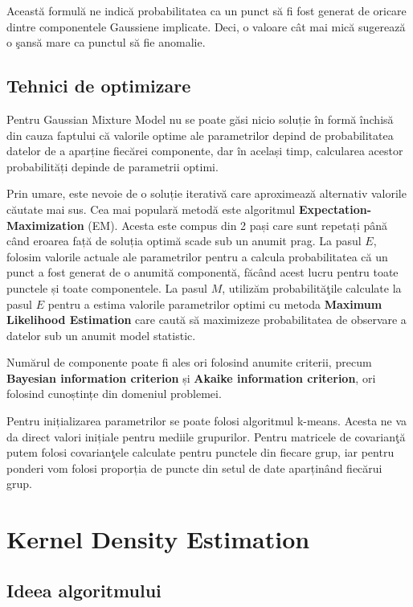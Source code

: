 Această formulă ne indică probabilitatea ca un punct să fi fost generat de oricare 
dintre componentele Gaussiene implicate. Deci, o valoare cât mai mică sugerează 
o şansă mare ca punctul să fie anomalie.

\subsection{Tehnici de optimizare}

Pentru Gaussian Mixture Model nu se poate găsi nicio 
soluție în formă închisă din cauza faptului că 
valorile optime ale parametrilor depind de probabilitatea 
datelor de a aparține fiecărei componente, dar în același 
timp, calcularea acestor probabilități depinde de 
parametrii optimi.

Prin umare, este nevoie de o soluție iterativă care 
aproximează alternativ valorile căutate mai sus.
Cea mai populară metodă este algoritmul 
\textbf{Expectation-Maximization} (EM). Acesta este compus din 
2 pași care sunt repetați până când eroarea față de 
soluția optimă scade sub un anumit prag. La pasul $E$,
folosim valorile actuale ale parametrilor pentru a 
calcula probabilitatea că un punct a fost generat 
de o anumită componentă, făcând acest lucru pentru 
toate punctele și toate componentele. La pasul $M$,
utilizăm probabilităţile calculate la pasul $E$ 
pentru a estima valorile parametrilor optimi 
cu metoda \textbf{Maximum Likelihood Estimation} care caută 
să maximizeze probabilitatea de observare a datelor 
sub un anumit model statistic.

Numărul de componente poate fi ales ori folosind anumite 
criterii, precum \textbf{Bayesian information criterion} 
și \textbf{Akaike information criterion}, 
ori folosind cunoștințe 
din domeniul problemei.

Pentru inițializarea parametrilor se poate folosi 
algoritmul k-means. Acesta ne va da direct valori 
inițiale pentru mediile grupurilor. Pentru matricele 
de covarianţă putem folosi covarianţele calculate 
pentru punctele din fiecare grup, iar pentru ponderi 
vom folosi proporția de puncte din setul de date
aparținând fiecărui grup\cite{EM-GMM-INIT}.

\section{Kernel Density Estimation}

\subsection{Ideea algoritmului}

